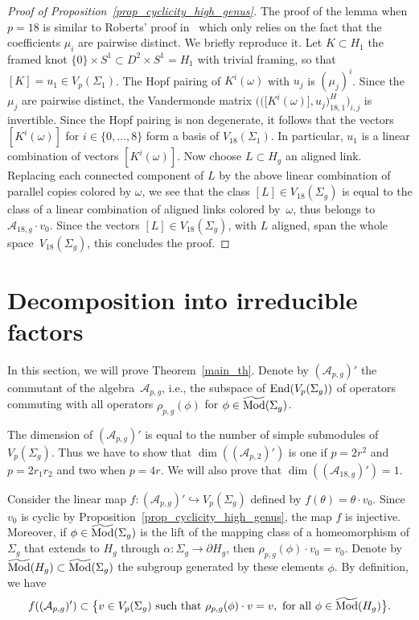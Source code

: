 \documentclass[11pt]{article}
\numberwithin{equation}{section}
\begin{document}
\begin{proof}[Proof of Proposition~\ref{prop_cyclicity_high_genus}]
The proof of the lemma when $p=18$ is similar to Roberts' proof in~\cite{Ro} which only relies on the fact that the coefficients $\mu_i$ are pairwise distinct. We briefly reproduce it. Let $K\subset H_1$ the framed knot $\{0\}\times S^1 \subset D^2\times S^1=H_1$ with trivial framing, so that $[K]=u_1\in V_p(\Sigma_1)$. The Hopf pairing of $K^i(\omega)$ with $u_j$ is $(\mu_j)^i$. Since the $\mu_j$ are pairwise distinct, the Vandermonde matrix $\big(\big( \big[K^i(\omega)\big], u_j \big)_{18, 1}^H\big)_{i,j}$ is invertible. Since the Hopf pairing is non degenerate, it follows that the vectors $[K^i (\omega)]$ for $i\in \{0, \ldots, 8 \}$ form a basis of $V_{18}(\Sigma_1)$. In particular, $u_1$ is a linear combination of vectors $[K^i(\omega)]$. Now choose $L\subset H_g$ an aligned link. Replacing each connected component of $L$ by the above linear combination of parallel copies colored by $\omega$, we see that the class $[L]\in V_{18}(\Sigma_g)$ is equal to the class of a linear combination of aligned links colored by~$\omega$, thus belongs to $\mathcal{A}_{18,g}\cdot v_0$. Since the vectors $[L]\in V_{18}(\Sigma_g)$, with $L$ aligned, span the whole space~$V_{18}(\Sigma_g)$, this concludes the proof.
\end{proof}

\section{Decomposition into irreducible factors}

 In this section, we will prove Theorem~\ref{main_th}. Denote by $(\mathcal{A}_{p,g})'$ the commutant of the algebra~$\mathcal{A}_{p,g}$, i.e., the subspace of $\operatorname{End}(V_p(\Sigma_g))$ of operators commuting with all operators $\rho_{p,g}(\phi)$ for $\phi\in \widetilde{\operatorname{Mod}}(\Sigma_g)$.

The dimension of $(\mathcal{A}_{p,g})'$ is equal to the number of simple submodules of $V_p(\Sigma_g)$. Thus we have to show that $\dim( (\mathcal{A}_{p,2})')$ is one if $p=2r^2$ and $p=2r_1r_2$ and two when $p=4r$. We will also prove that $\dim( (\mathcal{A}_{18,g})')=1$.

Consider the linear map $f\colon (\mathcal{A}_{p,g})' \hookrightarrow V_p(\Sigma_g)$ defined by $f(\theta)= \theta\cdot v_0$. Since $v_0$ is cyclic by Proposition~\ref{prop_cyclicity_high_genus}, the map $f$ is injective. Moreover, if $\phi \in \widetilde{\operatorname{Mod}}(\Sigma_g)$ is the lift of the mapping class of a homeomorphism of $\Sigma_g$ that extends to $H_g$ through $\alpha \colon \Sigma_g \rightarrow \partial H_g$, then $ \rho_{p,g}(\phi)\cdot v_0 = v_0$. Denote by $\widetilde{\operatorname{Mod}}(H_g)\subset \widetilde{\operatorname{Mod}}(\Sigma_g)$ the subgroup generated by these elements $\phi$. By definition, we have
\begin{gather*} f ( (\mathcal{A}_{p,g})' ) \subset \big\{ v\in V_p(\Sigma_g) \mbox{ such that } \rho_{p,g}(\phi)\cdot v = v, \mbox{ for all }\phi\in \widetilde{\operatorname{Mod}}(H_g) \big\}.\end{gather*}
\end{document}
